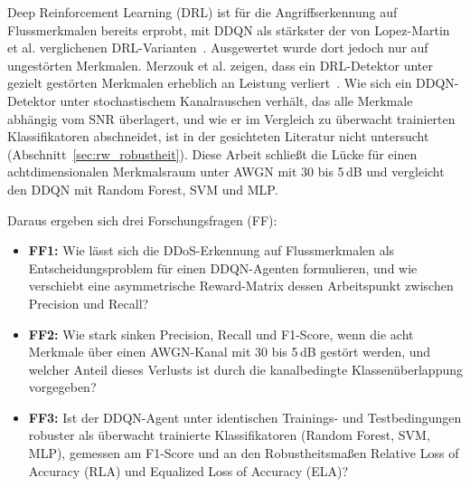 Deep Reinforcement Learning (DRL) ist für die Angriffserkennung auf Flussmerkmalen bereits erprobt, mit DDQN als stärkster der von Lopez-Martin et al. verglichenen DRL-Varianten~\autocite{lopez-martinApplicationDeepReinforcement2020}. Ausgewertet wurde dort jedoch nur auf ungestörten Merkmalen. Merzouk et al. zeigen, dass ein DRL-Detektor unter gezielt gestörten Merkmalen erheblich an Leistung verliert~\autocite{merzoukEvadingDeepReinforcement2022}. Wie sich ein DDQN-Detektor unter stochastischem Kanalrauschen verhält, das alle Merkmale abhängig vom SNR überlagert, und wie er im Vergleich zu überwacht trainierten Klassifikatoren abschneidet, ist in der gesichteten Literatur nicht untersucht (Abschnitt~\ref{sec:rw_robustheit}). Diese Arbeit schließt die Lücke für einen achtdimensionalen Merkmalsraum unter AWGN mit 30 bis 5\,dB und vergleicht den DDQN mit Random Forest, SVM und MLP.

Daraus ergeben sich drei Forschungsfragen (FF):
\begin{itemize}
    \item \textbf{FF1:} Wie lässt sich die DDoS-Erkennung auf Flussmerkmalen als Entscheidungsproblem für einen DDQN-Agenten formulieren, und wie verschiebt eine asymmetrische Reward-Matrix dessen Arbeitspunkt zwischen Precision und Recall?
    \item \textbf{FF2:} Wie stark sinken Precision, Recall und F1-Score, wenn die acht Merkmale über einen AWGN-Kanal mit 30 bis 5\,dB gestört werden, und welcher Anteil dieses Verlusts ist durch die kanalbedingte Klassenüberlappung vorgegeben?
    \item \textbf{FF3:} Ist der DDQN-Agent unter identischen Trainings- und Testbedingungen robuster als überwacht trainierte Klassifikatoren (Random Forest, SVM, MLP), gemessen am F1-Score und an den Robustheitsmaßen Relative Loss of Accuracy (RLA) und Equalized Loss of Accuracy (ELA)?
\end{itemize}

